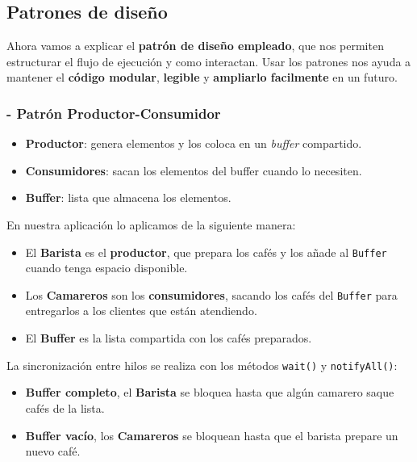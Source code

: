 \documentclass[a4paper,12pt]{report}
\begin{document}
\clearpage{}

\subsection{Patrones de diseño}
\noindent Ahora vamos a explicar el \textbf{patrón de diseño empleado}, que nos permiten estructurar el flujo de ejecución y como interactan.
Usar los patrones nos ayuda a mantener el \textbf{código modular}, \textbf{legible} y \textbf{ampliarlo facilmente} en un futuro.

\subsubsection{- Patrón Productor-Consumidor}
\begin{itemize}
    \item \textbf{Productor}: genera elementos y los coloca en un \textit{buffer} compartido.
    \item \textbf{Consumidores}: sacan los elementos del buffer cuando lo necesiten.
    \item \textbf{Buffer}: lista que almacena los elementos.
\end{itemize}

En nuestra aplicación lo aplicamos de la siguiente manera:

\begin{itemize}
    \item El \textbf{Barista} es el \textbf{productor}, que prepara los cafés
    y los añade al \texttt{Buffer} cuando tenga espacio disponible.
    \item Los \textbf{Camareros} son los \textbf{consumidores}, sacando los cafés
    del \texttt{Buffer} para entregarlos a los clientes que están atendiendo.
    \item El \textbf{Buffer} es la lista compartida con los cafés preparados.
\end{itemize}

La sincronización entre hilos se realiza con los métodos \texttt{wait()} y \texttt{notifyAll()}:

\begin{itemize}
    \item \textbf{Buffer completo}, el \textbf{Barista} se bloquea hasta que algún camarero
    saque cafés de la lista.
    \item \textbf{Buffer vacío}, los \textbf{Camareros} se bloquean hasta que el barista
    prepare un nuevo café.
\end{itemize}
\end{document}
